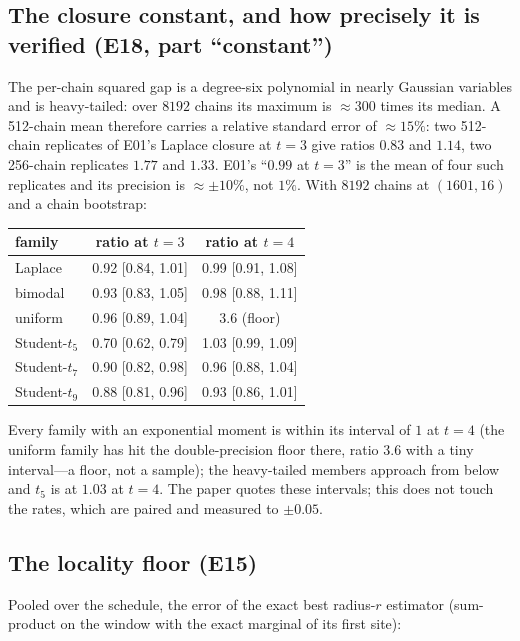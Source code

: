\subsection{The closure constant, and how precisely it is verified (E18, part ``constant'')}
\label{sec:const}
The per-chain squared gap is a degree-six polynomial in nearly Gaussian variables and is heavy-tailed: over $8192$ chains its maximum is $\approx300$ times its median. A 512-chain mean therefore carries a relative standard error of $\approx15\%$: two 512-chain replicates of E01's Laplace closure at $t=3$ give ratios $0.83$ and $1.14$, two 256-chain replicates $1.77$ and $1.33$. E01's ``$0.99$ at $t=3$'' is the mean of four such replicates and its precision is $\approx\pm10\%$, not $1\%$. With $8192$ chains at $(1601,16)$ and a chain bootstrap:

\begin{center}\small
\begin{tabular}{@{}lcc@{}}
\toprule
family & ratio at $t=3$ & ratio at $t=4$ \\
\midrule
Laplace & 0.92 [0.84, 1.01] & 0.99 [0.91, 1.08] \\
bimodal & 0.93 [0.83, 1.05] & 0.98 [0.88, 1.11] \\
uniform & 0.96 [0.89, 1.04] & 3.6 (floor) \\
Student-$t_5$ & 0.70 [0.62, 0.79] & 1.03 [0.99, 1.09] \\
Student-$t_7$ & 0.90 [0.82, 0.98] & 0.96 [0.88, 1.04] \\
Student-$t_9$ & 0.88 [0.81, 0.96] & 0.93 [0.86, 1.01] \\
\bottomrule
\end{tabular}
\end{center}
Every family with an exponential moment is within its interval of $1$ at $t=4$ (the uniform family has hit the double-precision floor there, ratio $3.6$ with a tiny interval---a floor, not a sample); the heavy-tailed members approach from below and $t_5$ is at $1.03$ at $t=4$. The paper quotes these intervals; this does not touch the rates, which are paired and measured to $\pm0.05$.

\subsection{The locality floor (E15)}
\label{sec:e15}
Pooled over the schedule, the error of the exact best radius-$r$ estimator (sum-product on the window with the exact marginal of its first site):

